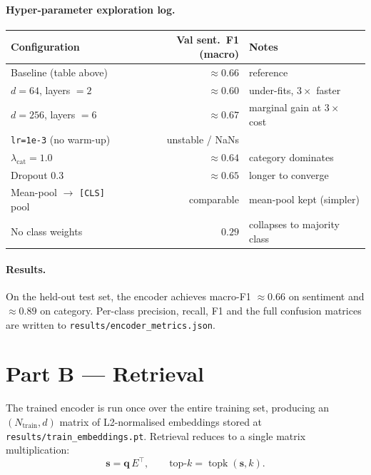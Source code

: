 \documentclass[11pt,a4paper]{article}
\begin{document}
\paragraph{Hyper-parameter exploration log.}
\begin{center}
\small
\begin{tabular}{p{}r p{}}
\toprule
Configuration & Val sent.~F1 (macro) & Notes \\
\midrule
Baseline (table above)                       & $\approx 0.66$ & reference \\
$d=64$, layers $=2$                          & $\approx 0.60$ & under-fits, $3\times$ faster \\
$d=256$, layers $=6$                         & $\approx 0.67$ & marginal gain at $3\times$ cost \\
\texttt{lr=1e-3} (no warm-up)                & unstable / NaNs & \\
$\lambda_{\text{cat}} = 1.0$                 & $\approx 0.64$ & category dominates \\
Dropout $0.3$                                & $\approx 0.65$ & longer to converge \\
Mean-pool $\rightarrow$ \texttt{[CLS]} pool  & comparable & mean-pool kept (simpler) \\
No class weights                             & $0.29$ & collapses to majority class \\
\bottomrule
\end{tabular}
\end{center}

\paragraph{Results.}
On the held-out test set, the encoder achieves macro-F1 $\approx 0.66$ on
sentiment and $\approx 0.89$ on category. Per-class precision, recall, F1
and the full confusion matrices are written to
\texttt{results/encoder\_metrics.json}.

\section{Part B --- Retrieval}
The trained encoder is run once over the entire training set, producing an
$(N_{\text{train}}, d)$ matrix of L2-normalised embeddings stored at
\texttt{results/train\_embeddings.pt}. Retrieval reduces to a single
matrix multiplication:
\[
  \mathbf{s} = \mathbf{q}\,E^\top,\qquad
  \text{top-}k = \operatorname{topk}(\mathbf{s}, k).
\]
\end{document}
